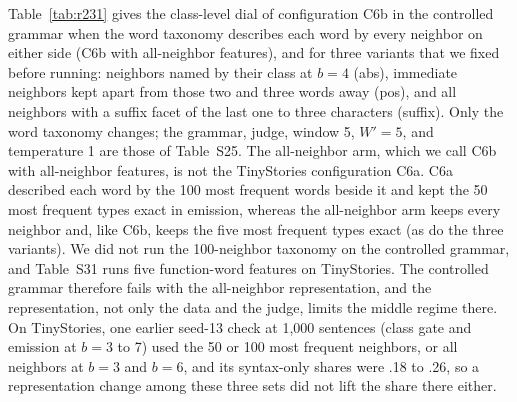 \documentclass[11pt,letterpaper]{article}
\begin{document}
Table~\ref{tab:r231} gives the class-level dial of configuration C6b in the controlled grammar when the word taxonomy describes each word by every neighbor on either side (C6b with all-neighbor features), and for three variants that we fixed before running: neighbors named by their class at $b=4$ (abs), immediate neighbors kept apart from those two and three words away (pos), and all neighbors with a suffix facet of the last one to three characters (suffix). Only the word taxonomy changes; the grammar, judge, window 5, $W'=5$, and temperature 1 are those of Table~S25.
The all-neighbor arm, which we call C6b with all-neighbor features, is not the TinyStories configuration C6a. C6a described each word by the 100 most frequent words beside it and kept the 50 most frequent types exact in emission, whereas the all-neighbor arm keeps every neighbor and, like C6b, keeps the five most frequent types exact (as do the three variants). We did not run the 100-neighbor taxonomy on the controlled grammar, and Table~S31 runs five function-word features on TinyStories.
The controlled grammar therefore fails with the all-neighbor representation, and the representation, not only the data and the judge, limits the middle regime there.
On TinyStories, one earlier seed-13 check at 1,000 sentences (class gate and emission at $b=3$ to 7) used the 50 or 100 most frequent neighbors, or all neighbors at $b=3$ and $b=6$, and its syntax-only shares were .18 to .26, so a representation change among these three sets did not lift the share there either.
\end{document}
